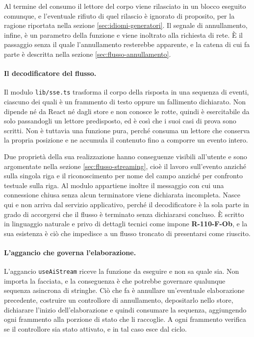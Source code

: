 \documentclass[a4paper, 10pt]{article}
\begin{document}
Al termine del consumo il lettore del corpo viene rilasciato in un blocco eseguito comunque, e l'eventuale rifiuto di quel rilascio è ignorato di proposito, per la ragione riportata nella sezione \ref{sec:idiomi-generatori}. Il segnale di annullamento, infine, è un parametro della funzione e viene inoltrato alla richiesta di rete. È il passaggio senza il quale l'annullamento resterebbe apparente, e la catena di cui fa parte è descritta nella sezione \ref{sec:flusso-annullamento}.

\paragraph{Il decodificatore del flusso.}
Il modulo \texttt{lib/sse.ts} trasforma il corpo della risposta in una sequenza di eventi, ciascuno dei quali è un frammento di testo oppure un fallimento dichiarato. Non dipende né da React né dagli store e non conosce le rotte, quindi è esercitabile da solo passandogli un lettore predisposto, ed è così che i suoi casi di prova sono scritti. Non è tuttavia una funzione pura, perché consuma un lettore che conserva la propria posizione e ne accumula il contenuto fino a comporre un evento intero.

Due proprietà della sua realizzazione hanno conseguenze visibili all'utente e sono argomentate nella sezione \ref{sec:flusso-streaming}, cioè il lavoro sull'evento anziché sulla singola riga e il riconoscimento per nome del campo anziché per confronto testuale sulla riga. Al modulo appartiene inoltre il messaggio con cui una connessione chiusa senza alcun terminatore viene dichiarata incompleta. Nasce qui e non arriva dal servizio applicativo, perché il decodificatore è la sola parte in grado di accorgersi che il flusso è terminato senza dichiararsi concluso. È scritto in linguaggio naturale e privo di dettagli tecnici come impone \textbf{R-110-F-Ob}, e la sua esistenza è ciò che impedisce a un flusso troncato di presentarsi come riuscito.

\paragraph{L'aggancio che governa l'elaborazione.}
L'aggancio \texttt{useAiStream} riceve la funzione da eseguire e non sa quale sia. Non importa la facciata, e la conseguenza è che potrebbe governare qualunque sequenza asincrona di stringhe. Ciò che fa è annullare un'eventuale elaborazione precedente, costruire un controllore di annullamento, depositarlo nello store, dichiarare l'inizio dell'elaborazione e quindi consumare la sequenza, aggiungendo ogni frammento alla porzione di stato che li raccoglie. A ogni frammento verifica se il controllore sia stato attivato, e in tal caso esce dal ciclo.
\end{document}
